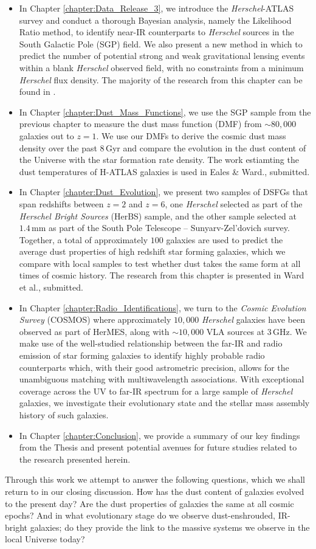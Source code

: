 \begin{itemize}
	\item In Chapter \ref{chapter:Data_Release_3}, we introduce the \textit{Herschel}-ATLAS survey and conduct a thorough Bayesian analysis, namely the Likelihood Ratio method, to identify near-IR counterparts to \textit{Herschel} sources in the South Galactic Pole (SGP) field. We also present a new method in which to predict the number of potential strong and weak gravitational lensing events within a blank \textit{Herschel} observed field, with no constraints from a minimum \textit{Herschel} flux density. The majority of the research from this chapter can be found in \citealt{Ward_2022}.
	\item In Chapter \ref{chapter:Dust_Mass_Functions}, we use the SGP sample from the previous chapter to measure the dust mass function (DMF) from $\sim80,000$ galaxies out to $z = 1$. We use our DMFs to derive the cosmic dust mass density over the past $8\,$Gyr and compare the evolution in the dust content of the Universe with the star formation rate density. The work estiamting the dust temperatures of H-ATLAS galaxies is used in Eales \& Ward., submitted.
	\item In Chapter \ref{chapter:Dust_Evolution}, we present two samples of DSFGs that span redshifts between $z=2$ and $z=6$, one \textit{Herschel} selected as part of the \textit{Herschel Bright Sources} (HerBS) sample, and the other sample selected at $1.4\,$mm as part of the South Pole Telescope -- Sunyarv-Zel'dovich survey. Together, a total of approximately $100$ galaxies are used to predict the average dust properties of high redshift star forming galaxies, which we compare with local samples to test whether dust takes the same form at all times of cosmic history. The research from this chapter is presented in Ward et al., submitted.
	\item In Chapter \ref{chapter:Radio_Identifications}, we turn to the \textit{Cosmic Evolution Survey} (COSMOS) where approximately $10,000$ \textit{Herschel} galaxies have been observed as part of HerMES, along with $\sim10,000$ VLA sources at $3\,$GHz. We make use of the well-studied relationship between the far-IR and radio emission of star forming galaxies to identify highly probable radio counterparts which, with their good astrometric precision, allows for the unambiguous matching with multiwavelength associations. With exceptional coverage across the UV to far-IR spectrum for a large sample of \textit{Herschel} galaxies, we investigate their evolutionary state and the stellar mass assembly history of such galaxies.
	\item In Chapter \ref{chapter:Conclusion}, we provide a summary of our key findings from the Thesis and present potential avenues for future studies related to the research presented herein.
\end{itemize}

Through this work we attempt to answer the following questions, which we shall return to in our closing discussion. How has the dust content of galaxies evolved to the present day? Are the dust properties of galaxies the same at all cosmic epochs? And in what evolutionary stage do we observe dust-enshrouded, IR-bright galaxies; do they provide the link to the massive systems we observe in the local Universe today?